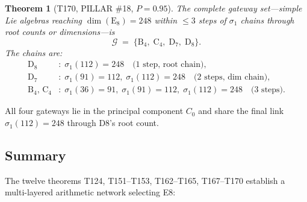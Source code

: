 \documentclass[aps,prd,twocolumn,superscriptaddress,floatfix,nofootinbib]{revtex4-2}
\newtheorem{theorem}{Theorem}
\theoremstyle{definition}
\theoremstyle{remark}
\begin{document}
\begin{theorem}[T170, PILLAR \#18, $P{=}0.95$]
The complete gateway set---simple Lie algebras reaching
$\dim(\mathrm{E}_8) = 248$ within $\le 3$ steps of $\sigma_1$ chains
through root counts or dimensions---is
\begin{equation}
  \mathcal{G} \;=\; \{\mathrm{B}_4,\; \mathrm{C}_4,\;
  \mathrm{D}_7,\; \mathrm{D}_8\}.
  \label{eq:gateway-set}
\end{equation}
The chains are:
\begin{align}
  \mathrm{D}_8 &:\; \sigma_1(112) = 248
    \quad\text{(1 step, root chain)}, \label{eq:gw-d8}\\
  \mathrm{D}_7 &:\; \sigma_1(91) = 112,\;
    \sigma_1(112) = 248
    \quad\text{(2 steps, dim chain)}, \label{eq:gw-d7}\\
  \mathrm{B}_4,\,\mathrm{C}_4 &:\; \sigma_1(36) = 91,\;
    \sigma_1(91) = 112,\; \sigma_1(112) = 248
    \quad\text{(3 steps)}.
    \label{eq:gw-b4c4}
\end{align}
\end{theorem}

\noindent
All four gateways lie in the principal component $C_0$ and share the
final link $\sigma_1(112) = 248$ through D8's root count.

\subsection{Summary}

The twelve theorems T124, T151--T153, T162--T165, T167--T170 establish
a multi-layered arithmetic network selecting E8:
\end{document}
